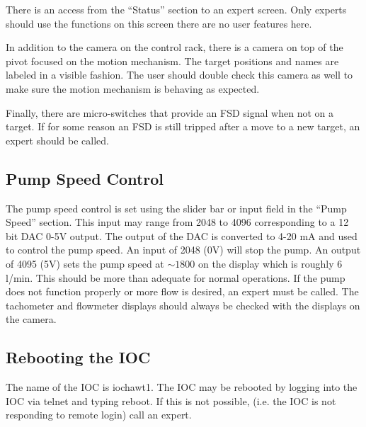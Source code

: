 {There is an access from the ``Status'' section to an expert screen.
Only experts should use the functions on this screen there are no
user features here.

In addition to the camera on the control rack, there is a camera on
top of the pivot focused on the motion mechanism. The target positions
and names are labeled in a visible fashion. The user should double
check this camera as well to make sure the motion mechanism is behaving
as expected.

Finally, there are micro-switches that provide an FSD signal when
not on a target. If for some reason an FSD is still tripped after
a move to a new target, an expert should be called.


\subsection{Pump Speed Control}

The pump speed control is set using the slider bar or input field
in the {}``Pump Speed'' section. This input may range from 2048
to 4096 corresponding to a 12 bit DAC 0-5V output. The output of the
DAC is converted to 4-20 mA and used to control the pump speed. An
input of 2048 (0V) will stop the pump. An output of 4095 (5V) sets
the pump speed at $\sim 1800$ on the display which is roughly 6 l/min.
This should be more than adequate for normal operations. If the pump
does not function properly or more flow is desired, an expert must
be called. The tachometer and flowmeter displays should always be
checked with the displays on the camera.


\subsection{Rebooting the IOC}

The name of the IOC is iochawt1. The IOC may be rebooted by logging
into the IOC via telnet and typing reboot. If this is not possible,
(i.e. the IOC is not responding to remote login) call an expert.
} %

